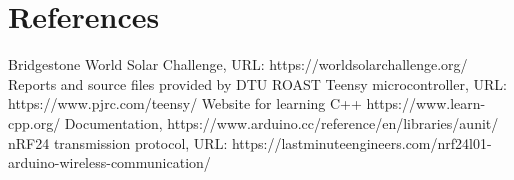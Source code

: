 \documentclass[conference]{IEEEtran}
\begin{document}
\section{References}
\begingroup
\renewcommand{\section}[2]{}%
\begin{thebibliography}{}
Bridgestone World Solar Challenge, 
URL: https://worldsolarchallenge.org/
Reports and source files provided by DTU ROAST
Teensy microcontroller,
URL: https://www.pjrc.com/teensy/
Website for learning C++
https://www.learn-cpp.org/
Documentation,
https://www.arduino.cc/reference/en/libraries/aunit/
nRF24 transmission protocol, URL: https://lastminuteengineers.com/nrf24l01-arduino-wireless-communication/
\end{thebibliography}
\endgroup
\end{document}
